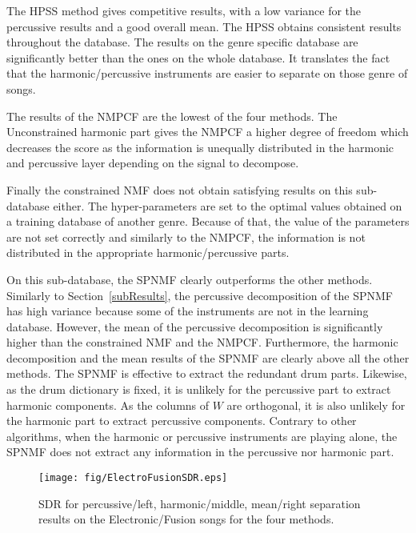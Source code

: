 The HPSS method gives competitive results, with a low variance for the percussive results and a good overall mean. The HPSS obtains consistent results throughout the database. The results on the genre specific database are significantly better than the ones on the whole database. It translates the fact that the harmonic/percussive instruments are easier to separate on those genre of songs. 
 
The results of the NMPCF are the lowest of the four methods. The Unconstrained harmonic part gives the NMPCF a higher degree of freedom which decreases the score as the information is unequally distributed in the harmonic and percussive layer depending on the signal to decompose. 

Finally the constrained NMF does not obtain satisfying results on this sub-database either. The hyper-parameters are set to the optimal values obtained on a training database of another genre. Because of that, the value of the parameters are not set correctly and similarly to the NMPCF, the information is not distributed in the appropriate harmonic/percussive parts. 


On this sub-database, the SPNMF clearly outperforms the other methods. Similarly to Section~\ref{subResults}, the percussive decomposition of the SPNMF has high variance because some of the instruments are not in the learning database. However, the mean of the percussive decomposition is significantly higher than the constrained NMF and the NMPCF. Furthermore, the harmonic decomposition and the mean results of the SPNMF are clearly above all the other methods. The SPNMF is effective to extract the redundant drum parts. Likewise, as the drum dictionary is fixed, it is unlikely for the percussive part to extract harmonic components. As the columns of $W$ are orthogonal, it is also unlikely for the harmonic part to extract percussive components. Contrary to other algorithms, when the harmonic or percussive instruments are playing alone, the SPNMF does not extract any information in the percussive nor harmonic part.



\begin{figure}[htb]

  \centering 
  \texttt{[image: fig/ElectroFusionSDR.eps]}
  \caption{\label{ElectroFusionSDR} SDR for percussive/left, harmonic/middle, mean/right separation results on the Electronic/Fusion songs for the four methods.}
  
\end{figure}

